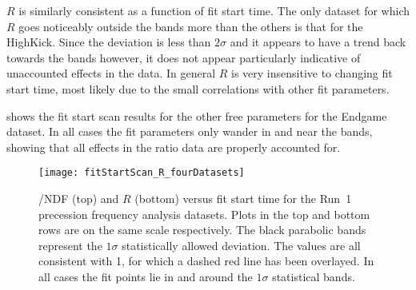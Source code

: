 $R$ is similarly consistent as a function of fit start time. The only dataset for which $R$ goes noticeably outside the bands more than the others is that for the HighKick. Since the deviation is less than $2\sigma$ and it appears to have a trend back towards the bands however, it does not appear particularly indicative of unaccounted effects in the data. In general $R$ is very insensitive to changing fit start time, most likely due to the small correlations with other fit parameters.


 shows the fit start scan results for the other free parameters for the Endgame dataset. In all cases the fit parameters only wander in and near the bands, showing that all effects in the ratio data are properly accounted for.


\begin{landscape}
\begin{figure}
    \centering
    \texttt{[image: fitStartScan\_R\_fourDatasets]}
    \caption[\chisq/NDF and $R$ versus fit start time]{\chisq/NDF (top) and $R$ (bottom) versus fit start time for the Run~1 precession frequency analysis datasets. Plots in the top and bottom rows are on the same scale respectively. The black parabolic bands represent the $1\sigma$ statistically allowed deviation. The \chisq values are all consistent with 1, for which a dashed red line has been overlayed. In all cases the fit points lie in and around the $1\sigma$ statistical bands.}
    \label{fig:fitStartTime_chi2_and_R}
\end{figure}
\end{landscape}


